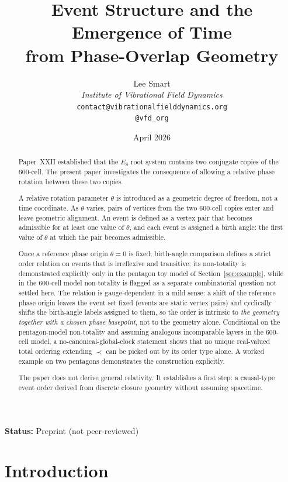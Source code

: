 \documentclass[12pt]{article}
\title{Event Structure and the Emergence of Time\\from Phase-Overlap Geometry}
\author{%
  Lee Smart\\[4pt]
  \textit{Institute of Vibrational Field Dynamics}\\[2pt]
  \texttt{contact@vibrationalfielddynamics.org}\\[2pt]
  \texttt{@vfd\_org}%
}
\date{April 2026}
\begin{document}
\maketitle

\noindent\textbf{Status:} Preprint (not peer-reviewed)

\begin{abstract}
Paper~XXII established that the $E_8$ root system contains two conjugate copies of the 600-cell. The present paper investigates the consequence of allowing a relative phase rotation between these two copies.

A relative rotation parameter $\theta$ is introduced as a geometric degree of freedom, not a time coordinate. As $\theta$ varies, pairs of vertices from the two 600-cell copies enter and leave geometric alignment. An event is defined as a vertex pair that becomes admissible for at least one value of $\theta$, and each event is assigned a birth angle: the first value of $\theta$ at which the pair becomes admissible.

Once a reference phase origin $\theta = 0$ is fixed, birth-angle comparison defines a strict order relation on events that is irreflexive and transitive; its non-totality is demonstrated explicitly only in the pentagon toy model of Section~\ref{sec:example}, while in the 600-cell model non-totality is flagged as a separate combinatorial question not settled here. The relation is gauge-dependent in a mild sense: a shift of the reference phase origin leaves the event set fixed (events are static vertex pairs) and cyclically shifts the birth-angle labels assigned to them, so the order is intrinsic to \emph{the geometry together with a chosen phase basepoint}, not to the geometry alone. Conditional on the pentagon-model non-totality and assuming analogous incomparable layers in the 600-cell model, a no-canonical-global-clock statement shows that no unique real-valued total ordering extending $\prec$ can be picked out by its order type alone. A worked example on two pentagons demonstrates the construction explicitly.

The paper does not derive general relativity. It establishes a first step: a causal-type event order derived from discrete closure geometry without assuming spacetime.
\end{abstract}

\section{Introduction}\label{sec:intro}
\end{document}
